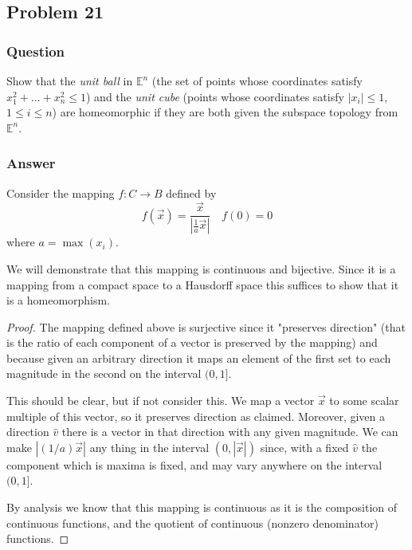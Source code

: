 \documentclass[10pt]{article}
\begin{document}
\subsection{Problem 21}

\subsubsection{Question}
Show that the \emph{unit ball} in $\mathbb{E}^n$ (the set of points whose coordinates satisfy $x_1^2+ \dots + x_n^2 \leq 1$) and the \emph{unit cube} (points whose coordinates satisfy $|x_i|\leq 1$, $1\leq i \leq n$) are homeomorphic if they are both given the subspace topology from $\mathbb{E}^n$.
\subsubsection{Answer}


Consider the mapping $f: C \to B$ defined by 
\[f(\vec{x}) = \frac{\vec{x}}{|\frac{1}{a} \vec{x} |} \quad f(0)=0\]
where $a= \max{(x_i)}$.

We will demonstrate that this mapping is continuous and bijective. Since it is a mapping from a compact space to a Hausdorff space this suffices to show that it is a homeomorphism.

\begin{proof}
The mapping defined above is surjective since it "preserves direction" (that is the ratio of each component of a vector is preserved by the mapping) and because given an arbitrary direction it maps an element of the first set to each magnitude in the second on the interval $(0,1]$.

This should be clear, but if not consider this. We map a vector $\vec{x}$ to some scalar multiple of this vector, so it preserves direction as claimed. Moreover, given a direction $\hat{v}$ there is a vector in that direction with any given magnitude. We can make $|(1/a) \vec{x}|$ any thing in the interval $(0,|\vec{x}|)$ since, with a fixed $\hat{v}$ the component which is maxima is fixed, and may vary anywhere on the interval $(0,1]$.

By analysis we know that this mapping is continuous as it is the composition of continuous functions, and the quotient of continuous (nonzero denominator) functions.
\end{proof}
\end{document}
